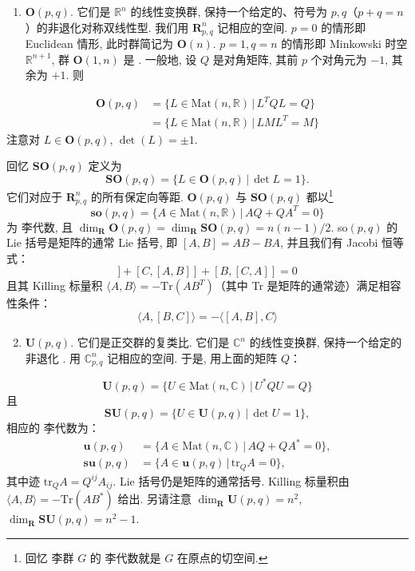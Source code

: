 \begin{enumerate}
\item {} $\mathbf{O}(p, q)$. 它们是 $\mathbb{R}^n$ 的线性变换群, 保持一个给定的、符号为 $p, q$（$p+q = n$）的非退化对称双线性型. 我们用 $\mathbf{R}^n_{p, q}$ 记相应的空间. $p = 0$ 的情形即 Euclidean 情形, 此时群简记为 $\mathbf{O}(n)$. $p = 1, q = n$ 的情形即 Minkowski 时空 $\mathbb{R}^{n+1}$, 群 $\mathbf{O}(1, n)$ 是 . 一般地, 设 $Q$ 是对角矩阵, 其前 $p$ 个对角元为 $-1$, 其余为 $+1$. 则
\end{enumerate}
\[
\begin{aligned}
\mathbf{O}(p, q) &= \{L \in \mathrm{Mat}(n, \mathbb{R})\, |\, L^TQL = Q\}\\
&= \{L \in \mathrm{Mat}(n, \mathbb{R})\, |\, LML^T = M\}
\end{aligned}
\]
注意对 $L \in \mathbf{O}(p, q)$, $\det(L) = \pm 1$. 

回忆  $\mathbf{SO}(p, q)$ 定义为
\[
\mathbf{SO}(p, q) = \{L \in \mathbf{O}(p, q)\, |\, \det L = 1\}.
\]
它们对应于 $\mathbf{R}^n_{p, q}$ 的所有保定向等距. $\mathbf{O}(p, q)$ 与 $\mathbf{SO}(p, q)$ 都以\footnote{回忆 李群 $G$ 的 李代数就是 $G$ 在原点的切空间. }
\[
\mathbf{so}(p, q) = \{A \in \mathrm{Mat}(n, \mathbb{R})\, |\, AQ + QA^T = 0\}
\]
为 李代数, 且 $\dim_{\mathbf{R}}\mathbf{O}(p, q) = \dim_{\mathbf{R}}\mathbf{SO}(p, q) = n(n-1)/2$. so$(p, q)$ 的 Lie 括号是矩阵的通常 Lie 括号, 即 $[A, B] = AB - BA$, 并且我们有 Jacobi 恒等式：
\begin{equation}
[A, [B, C]] + [C, [A, B]] + [B, [C, A]] = 0\label{eq:c1-45}
\end{equation}
且其 Killing 标量积 $\langle A, B\rangle = -\mathrm{Tr}(AB^T)$（其中 Tr 是矩阵的通常迹）满足相容性条件：
\begin{equation}
\langle A, [B, C]\rangle = -\langle[A, B], C\rangle\label{eq:c1-46}
\end{equation}

\begin{enumerate}
\setcounter{enumi}{1}
\item {} $\mathbf{U}(p, q)$. 它们是正交群的复类比. 它们是 $\mathbb{C}^n$ 的线性变换群, 保持一个给定的非退化 . 用 $\mathbb{C}^n_{p, q}$ 记相应的空间. 于是, 用上面的矩阵 $Q$：
\end{enumerate}
\[
\mathbf{U}(p, q) = \{U \in \mathrm{Mat}(n, \mathbb{C})\, |\, U^*QU = Q\}
\]
且
\[
\mathbf{SU}(p, q) = \{U \in \mathbf{U}(p, q)\, |\, \det U = 1\},
\]
相应的 李代数为：
\[
\begin{aligned}
\mathbf{u}(p, q) &= \{A \in \mathrm{Mat}(n, \mathbb{C})\, |\, AQ + QA^* = 0\}, \\
\mathbf{su}(p, q) &= \{A \in \mathbf{u}(p, q)\, |\, \mathrm{tr}_Q A = 0\},
\end{aligned}
\]
其中迹 $\mathrm{tr}_Q A = Q^{ij}A_{ij}$. Lie 括号仍是矩阵的通常括号. Killing 标量积由 $\langle A, B\rangle = -\mathrm{Tr}(AB^*)$ 给出. 另请注意 $\dim_{\mathbf{R}}\mathbf{U}(p, q) = n^2$, $\dim_{\mathbf{R}}\mathbf{SU}(p, q) = n^2 - 1$. 

